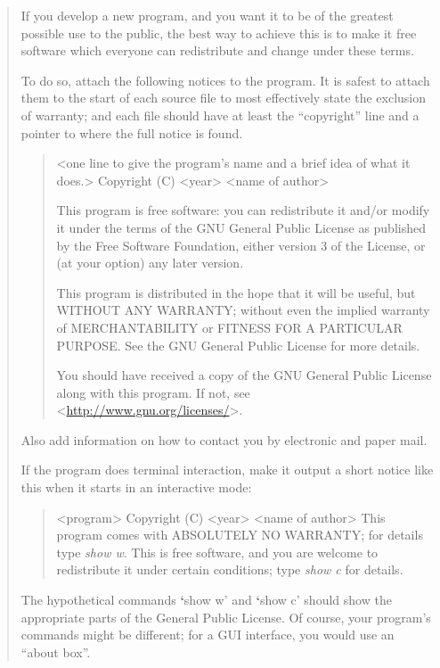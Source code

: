 \documentclass[letterpaper,10pt,english]{sphinxmanual}
\begin{document}
\begin{quote}

If you develop a new program, and you want it to be of the greatest
possible use to the public, the best way to achieve this is to make it
free software which everyone can redistribute and change under these terms.

To do so, attach the following notices to the program.  It is safest
to attach them to the start of each source file to most effectively
state the exclusion of warranty; and each file should have at least
the ``copyright'' line and a pointer to where the full notice is found.
\begin{quote}

\textless{}one line to give the program's name and a brief idea of what it does.\textgreater{}
Copyright (C) \textless{}year\textgreater{}  \textless{}name of author\textgreater{}

This program is free software: you can redistribute it and/or modify
it under the terms of the GNU General Public License as published by
the Free Software Foundation, either version 3 of the License, or
(at your option) any later version.

This program is distributed in the hope that it will be useful,
but WITHOUT ANY WARRANTY; without even the implied warranty of
MERCHANTABILITY or FITNESS FOR A PARTICULAR PURPOSE.  See the
GNU General Public License for more details.

You should have received a copy of the GNU General Public License
along with this program.  If not, see \textless{}\href{http://www.gnu.org/licenses/}{http://www.gnu.org/licenses/}\textgreater{}.
\end{quote}

Also add information on how to contact you by electronic and paper mail.

If the program does terminal interaction, make it output a short
notice like this when it starts in an interactive mode:
\begin{quote}

\textless{}program\textgreater{}  Copyright (C) \textless{}year\textgreater{}  \textless{}name of author\textgreater{}
This program comes with ABSOLUTELY NO WARRANTY; for details type \emph{show w}.
This is free software, and you are welcome to redistribute it
under certain conditions; type \emph{show c} for details.
\end{quote}

The hypothetical commands {\color{red}\bfseries{}{}`}show w' and {\color{red}\bfseries{}{}`}show c' should show the appropriate
parts of the General Public License.  Of course, your program's commands
might be different; for a GUI interface, you would use an ``about box''.


\end{quote}
\end{document}
